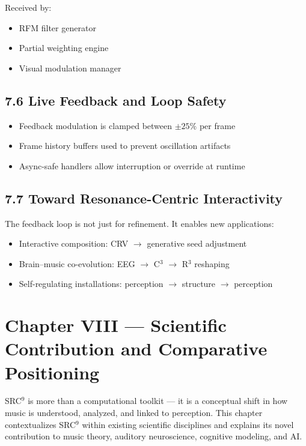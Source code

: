 Received by:

\begin{itemize}
    \item RFM filter generator
    \item Partial weighting engine
    \item Visual modulation manager
\end{itemize}

\subsection*{7.6 Live Feedback and Loop Safety}

\begin{itemize}
    \item Feedback modulation is clamped between $\pm 25\%$ per frame
    \item Frame history buffers used to prevent oscillation artifacts
    \item Async-safe handlers allow interruption or override at runtime
\end{itemize}

\subsection*{7.7 Toward Resonance-Centric Interactivity}

The feedback loop is not just for refinement. It enables new applications:

\begin{itemize}
    \item Interactive composition: CRV $\rightarrow$ generative seed adjustment
    \item Brain–music co-evolution: EEG $\rightarrow$ C$^3$ $\rightarrow$ R$^3$ reshaping
    \item Self-regulating installations: perception $\rightarrow$ structure $\rightarrow$ perception
\end{itemize}

\section*{Chapter VIII — Scientific Contribution and Comparative Positioning}

SRC$^{9}$ is more than a computational toolkit — it is a conceptual shift in how music is understood, analyzed, and linked to perception. This chapter contextualizes SRC$^{9}$ within existing scientific disciplines and explains its novel contribution to music theory, auditory neuroscience, cognitive modeling, and AI.


